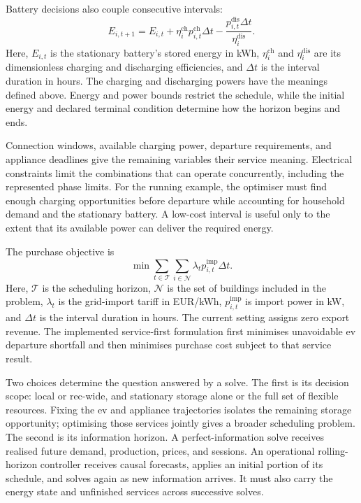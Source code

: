 \begin{samepage}
Battery decisions also couple consecutive intervals:
\begin{equation}
 E_{i,t+1}=E_{i,t}
 +\eta^{\mathrm{ch}}_i p^{\mathrm{ch}}_{i,t}\Delta t
 -\frac{p^{\mathrm{dis}}_{i,t}\Delta t}{\eta^{\mathrm{dis}}_i}.
 \label{eq:control-milp-storage}
\end{equation}
Here, $E_{i,t}$ is the stationary battery's stored energy in kWh, $\eta^{\mathrm{ch}}_i$ and $\eta^{\mathrm{dis}}_i$ are its dimensionless charging and discharging efficiencies, and $\Delta t$ is the interval duration in hours. The charging and discharging powers have the meanings defined above. Energy and power bounds restrict the schedule, while the initial energy and declared terminal condition determine how the horizon begins and ends.
\end{samepage}

Connection windows, available charging power, departure requirements, and appliance deadlines give the remaining variables their service meaning. Electrical constraints limit the combinations that can operate concurrently, including the represented phase limits. For the running example, the optimiser must find enough charging opportunities before departure while accounting for household demand and the stationary battery. A low-cost interval is useful only to the extent that its available power can deliver the required energy.

\begin{samepage}
The purchase objective is
\begin{equation}
 \min \sum_{t\in\mathcal{T}}\sum_{i\in\mathcal{N}}
 \lambda_t p^{\mathrm{imp}}_{i,t}\Delta t.
 \label{eq:control-milp-local-objective}
\end{equation}
Here, $\mathcal{T}$ is the scheduling horizon, $\mathcal{N}$ is the set of buildings included in the problem, $\lambda_t$ is the grid-import tariff in EUR/kWh, $p^{\mathrm{imp}}_{i,t}$ is import power in kW, and $\Delta t$ is the interval duration in hours. The current setting assigns zero export revenue. The implemented service-first formulation first minimises unavoidable \gls{ev} departure shortfall and then minimises purchase cost subject to that service result.
\end{samepage}

Two choices determine the question answered by a solve. The first is its decision scope: local or \gls{rec}-wide, and stationary storage alone or the full set of flexible resources. Fixing the \gls{ev} and appliance trajectories isolates the remaining storage opportunity; optimising those services jointly gives a broader scheduling problem. The second is its information horizon. A perfect-information solve receives realised future demand, production, prices, and sessions. An operational rolling-horizon controller receives causal forecasts, applies an initial portion of its schedule, and solves again as new information arrives. It must also carry the energy state and unfinished services across successive solves.

